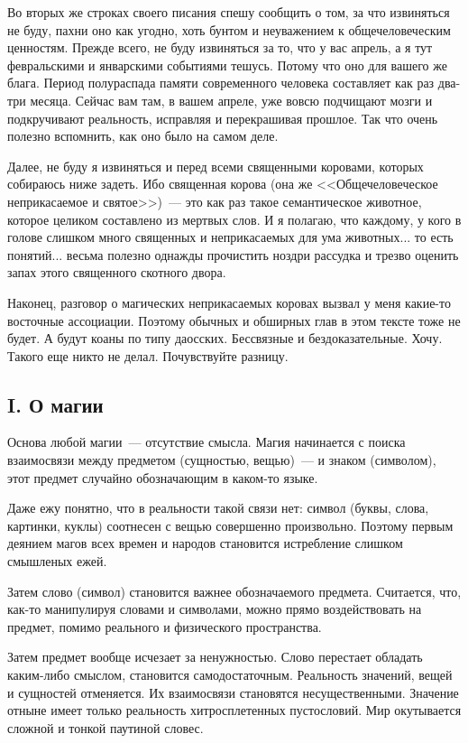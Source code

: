 \documentclass{scrbook}
\newcommand{\flqq}{<<}
\newcommand{\frqq}{>>}
\newcommand{\mdash}{~--- }
\newcommand{\essaysection}[1]{\subsection*{#1}\nopagebreak}
\begin{document}
Во вторых же строках своего писания спешу сообщить о том, за что извиняться не буду, пахни оно как угодно, хоть бунтом и неуважением к общечеловеческим ценностям. Прежде всего, не буду извиняться за то, что у вас апрель, а я тут февральскими и январскими событиями тешусь. Потому что оно для вашего же блага. Период полураспада памяти современного человека составляет как раз два-три месяца. Сейчас вам там, в вашем апреле, уже вовсю подчищают мозги и подкручивают реальность, исправляя и перекрашивая прошлое. Так что очень полезно вспомнить, как оно было на самом деле.

Далее, не буду я извиняться и перед всеми священными коровами, которых собираюсь ниже задеть. Ибо священная корова (она же {\flqq}Общечеловеческое неприкасаемое и святое{\frqq}){\mdash}это как раз такое семантическое животное, которое целиком составлено из мертвых слов. И я полагаю, что каждому, у кого в голове слишком много священных и неприкасаемых для ума животных... то есть понятий... весьма полезно однажды прочистить ноздри рассудка и трезво оценить запах этого священного скотного двора.

Наконец, разговор о магических неприкасаемых коровах вызвал у меня какие-то восточные ассоциации. Поэтому обычных и обширных глав в этом тексте тоже не будет. А будут коаны по типу даосских. Бессвязные и бездоказательные. Хочу. Такого еще никто не делал. Почувствуйте разницу.

\essaysection{I. О магии}

Основа любой магии{\mdash}отсутствие смысла. Магия начинается с поиска взаимосвязи между предметом (сущностью, вещью){\mdash}и знаком (символом), этот предмет случайно обозначающим в каком-то языке.

Даже ежу понятно, что в реальности такой связи нет: символ (буквы, слова, картинки, куклы) соотнесен с вещью совершенно произвольно. Поэтому первым деянием магов всех времен и народов становится истребление слишком смышленых ежей.

Затем слово (символ) становится важнее обозначаемого предмета. Считается, что, как-то манипулируя словами и символами, можно прямо воздействовать на предмет, помимо реального и физического пространства.

Затем предмет вообще исчезает за ненужностью. Слово перестает обладать каким-либо смыслом, становится самодостаточным. Реальность значений, вещей и сущностей отменяется. Их взаимосвязи становятся несущественными. Значение отныне имеет только реальность хитросплетенных пустословий. Мир окутывается сложной и тонкой паутиной словес.
\end{document}
